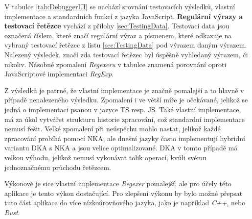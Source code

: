 V tabulce \ref{tab:DebuggerUI} se nachází srovnání testovacích výsledků, vlastní implementace a standardních funkcí z jazyka JavaScript.
\textbf{Regulární výrazy a testovací řetězce} vychází z přílohy \ref{sec:TestingData}. 
Testovací data jsou označená číslem, které značí regulární výraz a písmenem, které odkazuje na vybraný testovací řetězec z listu \ref{sec:TestingData} pod výrazem daným výrazem.
Nalezený výsledek, značí zda testovací řetězec byl úspěšně vyhledaný výrazem, či nikoliv. 
Násobné zpomalení \textit{Regexeru} v tabulce znamená porovnání oproti JavaScriptové implementaci \textit{RegExp}.

Z výsledků je patrné, že vlastní implementace je značně pomalejší a to hlavně v případě nenalezeného výsledku.
Zpomalení i ve větší míře je očekávané, jelikož se jedná o implementaci psanou v jazyce TS resp. JS.
Také vlastní implementace, má za úkol vytvářet strukturu historie zpracování, což standardní implementace nemusí řešit.
Velké zpomalení při neúspěchu mohlo nastat, jelikož každé zpracování probíhá pomocí NKA, ale dnešní jazyky často implementují hybridní variantu DKA s NKA a jsou velice optimalizované.
DKA v tomto případě má velkou výhodu, jelikož nemusí vykonávat tolik operací, kvůli svému jednoznačnému průchodu řetězcem.

Výkonově je sice vlastní implementace \textit{Regexer} pomalejší, ale pro účely této aplikace je tento výkon dostačující.
Pro zlepšení výkonu by bylo možné přepsat tuto část aplikace do více nízkoúrovňového jazyka, jako je například \textit{C++}, nebo \textit{Rust}.
